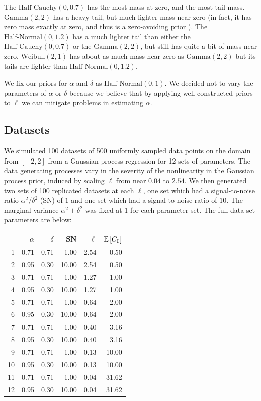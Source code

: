 \documentclass{article}
\newcommand{\Exp}[1]{\ensuremath{\mathbb{E} \lb #1 \rb}}
\newcommand{\lb}{\ensuremath{\left[}}
\newcommand{\rb}{\ensuremath{\right]}}
\begin{document}
The $\text{Half-Cauchy}(0, 0.7)$ has the most mass at zero, and the most tail
mass. $\text{Gamma}(2, 2)$ has a heavy tail, but much lighter mass near zero
(in fact, it has zero mass exactly at zero, and thus is a zero-avoiding prior
\citet{gelman2014bayesian}). The $\text{Half-Normal}(0, 1.2)$ has a much
lighter tail than either the $\text{Half-Cauchy}(0, 0.7)$ or the
$\text{Gamma}(2, 2)$, but still has quite a bit of mass near zero.
$\text{Weibull}(2, 1)$ has about as much mass near zero as $\text{Gamma}(2, 2)$
but its tails are lighter than $\text{Half-Normal}(0, 1.2)$.

We fix our priors for $\alpha$ and $\delta$ as $\text{Half-Normal}(0, 1)$. We
decided not to vary the parameters of $\alpha$ or $\delta$ because we believe
that by applying well-constructed priors to $\ell$ we can mitigate problems
in estimating $\alpha$. 

\subsection{Datasets}

We simulated 100 datasets of 500 uniformly sampled data points on the domain
from $[-2, 2]$ from a Gaussian process regression for 12 sets of parameters.
The data generating processes vary in the severity of the nonlinearity in the
Gaussian process prior, induced by scaling $\ell$ from near $0.04$ to $2.54$.
We then generated two sets of 100 replicated datasets at each $\ell$, one set
which had a signal-to-noise ratio $\alpha ^ 2/ \delta ^ 2$ (SN) of $1$ and one
set which had a signal-to-noise ratio of $10$. The marginal variance $\alpha ^
2 + \delta ^ 2$ was fixed at 1 for each parameter set. The full data set
parameters are below:

\begin{table}[ht]
\centering
\begin{tabular}{rrrrrr}
  \hline
  & $\alpha$ & $\delta$ & SN & $\ell$ & $\Exp{C_0}$ \\ 
  \hline
1 & 0.71 & 0.71 & 1.00 & 2.54 & 0.50 \\ 
  2 & 0.95 & 0.30 & 10.00 & 2.54 & 0.50 \\ 
  3 & 0.71 & 0.71 & 1.00 & 1.27 & 1.00 \\ 
  4 & 0.95 & 0.30 & 10.00 & 1.27 & 1.00 \\ 
  5 & 0.71 & 0.71 & 1.00 & 0.64 & 2.00 \\ 
  6 & 0.95 & 0.30 & 10.00 & 0.64 & 2.00 \\ 
  7 & 0.71 & 0.71 & 1.00 & 0.40 & 3.16 \\ 
  8 & 0.95 & 0.30 & 10.00 & 0.40 & 3.16 \\ 
  9 & 0.71 & 0.71 & 1.00 & 0.13 & 10.00 \\ 
  10 & 0.95 & 0.30 & 10.00 & 0.13 & 10.00 \\ 
  11 & 0.71 & 0.71 & 1.00 & 0.04 & 31.62 \\ 
  12 & 0.95 & 0.30 & 10.00 & 0.04 & 31.62 \\ 
   \hline
\end{tabular}
\end{table}
\end{document}
